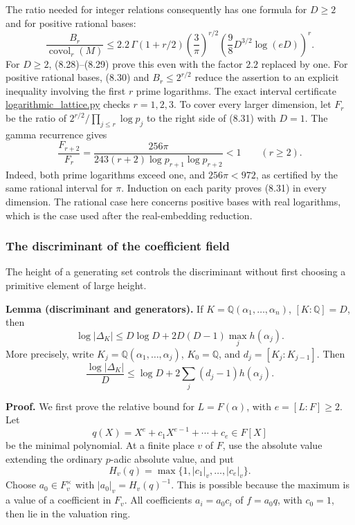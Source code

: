 \documentclass[
  11pt,
  a4paper,
]{article}
\begin{document}
The ratio needed for integer relations consequently has one formula for
\(D\ge2\) and for positive rational bases: \[
\frac{B_r}{\operatorname{covol}_r(M)}
\le
2.2\,\Gamma(1+r/2)
\left(\frac3\pi\right)^{r/2}
\left(\frac98D^{3/2}\log(eD)\right)^r.
\tag{8.31}
\] For \(D\ge2\), (8.28)--(8.29) prove this even with the factor \(2.2\)
replaced by one. For positive rational bases, (8.30) and
\(B_r\le2^{r/2}\) reduce the assertion to an explicit inequality
involving the first \(r\) prime logarithms. The exact interval
certificate
\href{https://kokunoyumeto.github.io/open-math-courses-public/courses/TR-BAKER/verification/logarithmic_lattice.py}{logarithmic\_lattice.py}
checks \(r=1,2,3\). To cover every larger dimension, let \(F_r\) be the
ratio of \(2^{r/2}/\prod_{j\le r}\log p_j\) to the right side of (8.31)
with \(D=1\). The gamma recurrence gives \[
\frac{F_{r+2}}{F_r}
=\frac{256\pi}
{243(r+2)\log p_{r+1}\log p_{r+2}}<1
\qquad(r\ge2).
\] Indeed, both prime logarithms exceed one, and \(256\pi<972\), as
certified by the same rational interval for \(\pi\). Induction on each
parity proves (8.31) in every dimension. The rational case here concerns
positive bases with real logarithms, which is the case used after the
real-embedding reduction.

\subsubsection{The discriminant of the coefficient
field}\label{the-discriminant-of-the-coefficient-field}

The height of a generating set controls the discriminant without first
choosing a primitive element of large height.

\textbf{Lemma (discriminant and generators).} If
\(K=\mathbb Q(\alpha_1,\ldots,\alpha_n)\), \([K:\mathbb Q]=D\), then \[
\log|\Delta_K|
\le D\log D+2D(D-1)\max_j h(\alpha_j).
\tag{8.32}
\] More precisely, write \(K_j=\mathbb Q(\alpha_1,\ldots,\alpha_j)\),
\(K_0=\mathbb Q\), and \(d_j=[K_j:K_{j-1}]\). Then \[
\frac{\log|\Delta_K|}{D}
\le \log D+2\sum_j(d_j-1)h(\alpha_j).
\tag{8.33}
\]

\textbf{Proof.} We first prove the relative bound for \(L=F(\alpha)\),
with \(e=[L:F]\ge2\). Let \[
q(X)=X^e+c_1X^{e-1}+\cdots+c_e\in F[X]
\] be the minimal polynomial. At a finite place \(v\) of \(F\), use the
absolute value extending the ordinary \(p\)-adic absolute value, and put
\[
H_v(q)=\max\{1,|c_1|_v,\ldots,|c_e|_v\}.
\] Choose \(a_0\in F_v^\times\) with \(|a_0|_v=H_v(q)^{-1}\). This is
possible because the maximum is a value of a coefficient in \(F_v\). All
coefficients \(a_i=a_0c_i\) of \(f=a_0q\), with \(c_0=1\), then lie in
the valuation ring.
\end{document}
